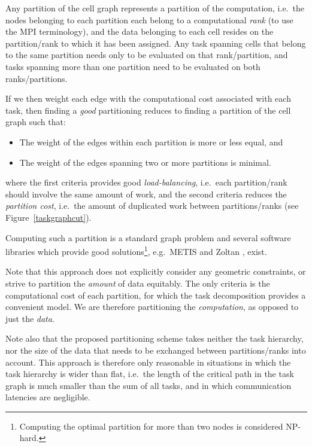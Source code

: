 \documentclass{sig-alternate-05-2015}
\begin{document}
Any partition of the cell graph represents a partition of the
computation, i.e.~the nodes belonging to each partition each belong
to a computational {\em rank} (to use the MPI terminology), and the
data belonging to each cell resides on the partition/rank to which
it has been assigned.
Any task spanning cells that belong to the same partition needs only
to be evaluated on that rank/partition, and tasks spanning more than
one partition need to be evaluated on both ranks/partitions.

If we then weight each edge with the computational cost associated with
each task, then finding a {\em good} partitioning reduces to finding a
partition of the cell graph such that:
\begin{itemize}
  \item The weight of the edges within each partition is more or less
    equal, and
  \item The weight of the edges spanning two or more partitions is
    minimal.
\end{itemize}
\noindent where the first criteria provides good {\em load-balancing},
i.e.~each partition/rank should involve the same amount of work, and
the second criteria reduces the {\em partition cost}, i.e.~the amount
of duplicated work between partitions/ranks
(see Figure~\ref{taskgraphcut}).

Computing such a partition is a standard graph problem and several
software libraries which provide good solutions\footnote{Computing
the optimal partition for more than two nodes is considered NP-hard.},
e.g.~METIS \cite{ref:Karypis1998} and Zoltan \cite{devine2002zoltan},
exist.

Note that this approach does not explicitly consider any geometric
constraints, or strive to partition the {\em amount} of data equitably.
The only criteria is the computational cost of each partition, for
which the task decomposition provides a convenient model.
We are therefore partitioning the {\em computation}, as opposed
to just the {\em data}.

Note also that the proposed partitioning scheme takes neither the
task hierarchy, nor the size of the data that needs to be exchanged
between partitions/ranks into account.
This approach is therefore only reasonable in situations in which
the task hierarchy is wider than flat, i.e.~the length of the critical
path in the task graph is much smaller than the sum of all tasks,
and in which communication latencies are negligible.
\end{document}
